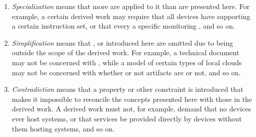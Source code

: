 \begin{enumerate}
\begin{enumerate}
	\item \textit{Specialization} means that more  are applied to it than are presented here. For example, a certain derived work may require that all devices have  supporting a certain instruction set, or that every   a specific monitoring , and so on.
	\item \textit{Simplification} means that ,  or  introduced here are omitted due to being outside the scope of the derived work. For example, a technical document may not be concerned with , while a model of certain types of local clouds may not be concerned with whether or not artifacts are  or not, and so on.
	\item \textit{Contradiction} means that a property or other constraint is introduced that makes it impossible to reconcile the concepts presented here with those in the derived work. A derived work must not, for example, demand that no devices ever host systems, or that services be provided directly by devices without them hosting systems, and so on.
	\end{enumerate}
\end{enumerate}